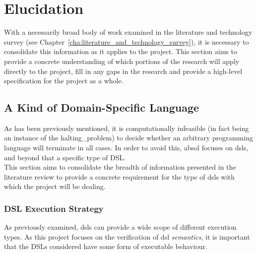 
\chapter{Elucidation} %
\label{cha:elucidation}
With a necessarily broad body of work examined in the literature and technology survey (see Chapter~\ref{cha:literature_and_technology_survey}), it is necessary to consolidate this information as it applies to the project. 
This section aims to provide a concrete understanding of which portions of the research will apply directly to the project, fill in any gaps in the research and provide a high-level specification for the project as a whole.

\section{A Kind of Domain-Specific Language} %
\label{sec:a_kind_of_domain_specific_language}
As has been previously mentioned, it is computationally infeasible (in fact being an instance of the \gls{halting_problem}) to decide whether an arbitrary programming language will terminate in all cases. 
In order to avoid this, \gls{absol} focuses on \glspl{dsl}, and beyond that a specific type of DSL. \\

This section aims to consolidate the breadth of information presented in the literature review to provide a concrete requirement for the type of \glspl{dsl} with which the project will be dealing. 

\subsection{DSL Execution Strategy} %
\label{sub:dsl_execution_strategy}
As previously examined, \glspl{dsl} can provide a wide scope of different execution types. 
As this project focuses on the verification of \gls{dsl} \textit{semantics}, it is important that the DSLs considered have some form of executable behaviour. \\

